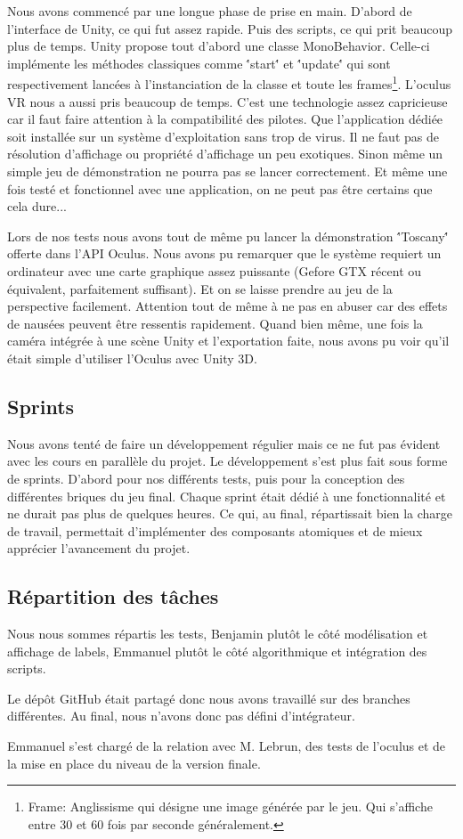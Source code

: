 \documentclass[a4paper,11pt]{myreport}
\begin{document}
\par Nous avons commencé par une longue phase de prise en main. D'abord de l'interface de Unity, ce qui fut assez rapide. Puis des scripts, ce qui prit beaucoup plus de temps.
Unity propose tout d'abord une classe MonoBehavior. Celle-ci implémente les méthodes classiques comme \''start\'' et \''update\'' qui sont respectivement lancées à l'instanciation de la classe et toute les frames\footnote{Frame: Anglissisme qui désigne une image générée par le jeu. Qui s'affiche entre 30 et 60 fois par seconde généralement.}. 
L'oculus VR nous a aussi pris beaucoup de temps. C'est une technologie assez capricieuse car il faut faire attention à la compatibilité des pilotes. Que l'application dédiée soit installée sur un système d'exploitation sans trop de virus. Il ne faut pas de résolution d'affichage ou propriété d'affichage un peu exotiques. Sinon même un simple jeu de démonstration ne pourra pas se lancer correctement.
Et même une fois testé et fonctionnel avec une application, on ne peut pas être certains que cela dure...
\par Lors de nos tests nous avons tout de même pu lancer la démonstration \''Toscany\'' offerte dans l'API Oculus. Nous avons pu remarquer que le système requiert un ordinateur avec une carte graphique assez puissante (Gefore GTX récent ou équivalent, parfaitement suffisant). Et on se laisse prendre au jeu de la perspective facilement. Attention tout de même à ne pas en abuser car des effets de nausées peuvent être ressentis rapidement. 
Quand bien même, une fois la caméra intégrée à une scène Unity et l'exportation faite, nous avons pu voir qu'il était simple d'utiliser l'Oculus avec Unity 3D.
\subsection{Sprints}
\par Nous avons tenté de faire un développement régulier mais ce ne fut pas évident avec les cours en parallèle du projet. Le développement s'est plus fait sous forme de sprints.
D'abord pour nos différents tests, puis pour la conception des différentes briques du jeu final.
Chaque sprint était dédié à une fonctionnalité et ne durait pas plus de quelques heures. Ce qui, au final, répartissait bien la charge de travail, permettait d'implémenter des composants atomiques et de mieux apprécier l'avancement du projet.

\subsection{Répartition des tâches}
\par Nous nous sommes répartis les tests, Benjamin plutôt le côté modélisation et affichage de labels, Emmanuel plutôt le côté algorithmique et intégration des scripts.
\par Le dépôt GitHub était partagé donc nous avons travaillé sur des branches différentes. Au final, nous n'avons donc pas défini d'intégrateur.
\par Emmanuel s'est chargé de la relation avec M. Lebrun, des tests de l'oculus et de la mise en place du niveau de la version finale.
\end{document}
